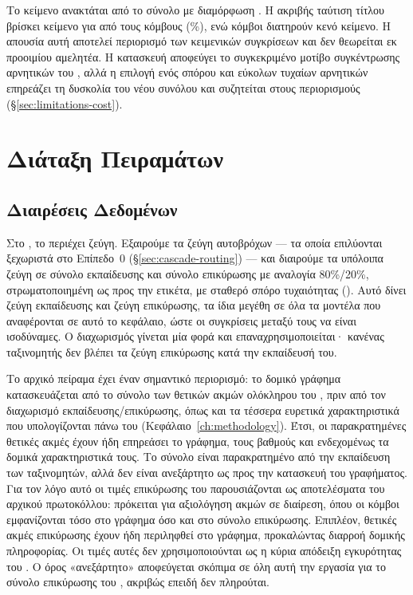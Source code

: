 Το κείμενο ανακτάται από το σύνολο  με διαμόρφωση
\texttt{\WfTextConfig{}}.
Η ακριβής ταύτιση τίτλου βρίσκει κείμενο για
\WfTextMatched{} από τους \WfTextWanted{} κόμβους (\WfTextMatchPct\%), ενώ
\WfTextEmptyN{} κόμβοι διατηρούν κενό κείμενο.
Η απουσία αυτή αποτελεί
περιορισμό των κειμενικών συγκρίσεων και δεν θεωρείται εκ προοιμίου αμελητέα.
Η κατασκευή αποφεύγει το συγκεκριμένο μοτίβο συγκέντρωσης αρνητικών του
, αλλά η επιλογή ενός σπόρου  και εύκολων τυχαίων
αρνητικών επηρεάζει τη δυσκολία του νέου συνόλου και συζητείται στους
περιορισμούς (\S\ref{sec:limitations-cost}).


\section{Διάταξη Πειραμάτων}
\label{sec:experimental-setup}

\subsection{Διαιρέσεις Δεδομένων}
\label{subsec:data-splits}

Στο , το \texttt{} περιέχει \TrainPairs{} ζεύγη.
Εξαιρούμε τα \SelfLoopsTrain{} ζεύγη
αυτοβρόχων --- τα οποία επιλύονται ξεχωριστά στο Επίπεδο~0 (\S\ref{sec:cascade-routing})
--- και διαιρούμε τα υπόλοιπα \TrainPairsNoSelf{} ζεύγη σε σύνολο εκπαίδευσης και σύνολο
επικύρωσης με αναλογία 80\%/20\%, στρωματοποιημένη ως προς την ετικέτα, με σταθερό
σπόρο τυχαιότητας (\texttt{}). Αυτό δίνει \TrainSplitSize{} ζεύγη
εκπαίδευσης και \ValSplitSize{} ζεύγη επικύρωσης, τα ίδια μεγέθη σε όλα τα μοντέλα που
αναφέρονται σε αυτό το κεφάλαιο, ώστε οι συγκρίσεις μεταξύ τους να είναι ισοδύναμες.
Ο διαχωρισμός γίνεται μία φορά και επαναχρησιμοποιείται· κανένας ταξινομητής δεν
βλέπει τα ζεύγη επικύρωσης κατά την εκπαίδευσή του.

Το αρχικό πείραμα  έχει έναν σημαντικό περιορισμό: το δομικό γράφημα
κατασκευάζεται από το σύνολο των θετικών ακμών ολόκληρου του
\texttt{}, πριν από τον διαχωρισμό εκπαίδευσης/επικύρωσης, όπως και τα
τέσσερα ευρετικά χαρακτηριστικά που
υπολογίζονται πάνω του (Κεφάλαιο~\ref{ch:methodology}). Έτσι, οι παρακρατημένες
θετικές ακμές έχουν ήδη επηρεάσει το γράφημα, τους βαθμούς και ενδεχομένως τα
δομικά χαρακτηριστικά τους.
Το σύνολο είναι παρακρατημένο από την εκπαίδευση των
ταξινομητών, αλλά δεν είναι ανεξάρτητο ως προς την κατασκευή του γραφήματος.
Για τον λόγο αυτό οι τιμές επικύρωσης του  παρουσιάζονται ως
αποτελέσματα του αρχικού πρωτοκόλλου: πρόκειται για αξιολόγηση ακμών σε
 διαίρεση, όπου οι κόμβοι εμφανίζονται τόσο στο γράφημα όσο
και στο σύνολο επικύρωσης. Επιπλέον, θετικές ακμές επικύρωσης έχουν ήδη
περιληφθεί στο γράφημα, προκαλώντας διαρροή δομικής πληροφορίας. Οι τιμές
αυτές δεν χρησιμοποιούνται ως η κύρια απόδειξη εγκυρότητας του .
Ο όρος
«ανεξάρτητο» αποφεύγεται σκόπιμα σε όλη αυτή την εργασία για το σύνολο
επικύρωσης του , ακριβώς επειδή δεν πληρούται.


